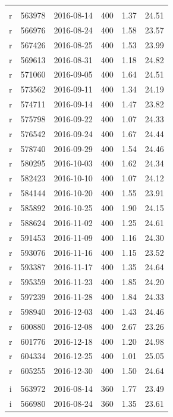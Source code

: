 \documentclass[letterpaper,preprint]{aastex62}
\begin{document}
\begin{table}
\begin{center}
\begin{tabular}{cccccc}
      \hline \\
      r & 563978 & 2016-08-14 & 400 & 1.37 & 24.51 \\
      r & 566976 & 2016-08-24 & 400 & 1.58 & 23.57 \\
      r & 567426 & 2016-08-25 & 400 & 1.53 & 23.99 \\
      r & 569613 & 2016-08-31 & 400 & 1.18 & 24.82 \\
      r & 571060 & 2016-09-05 & 400 & 1.64 & 24.51 \\
      r & 573562 & 2016-09-11 & 400 & 1.34 & 24.19 \\
      r & 574711 & 2016-09-14 & 400 & 1.47 & 23.82 \\
      r & 575798 & 2016-09-22 & 400 & 1.07 & 24.33 \\
      r & 576542 & 2016-09-24 & 400 & 1.67 & 24.44 \\
      r & 578740 & 2016-09-29 & 400 & 1.54 & 24.46 \\
      r & 580295 & 2016-10-03 & 400 & 1.62 & 24.34 \\
      r & 582423 & 2016-10-10 & 400 & 1.07 & 24.12 \\
      r & 584144 & 2016-10-20 & 400 & 1.55 & 23.91 \\
      r & 585892 & 2016-10-25 & 400 & 1.90 & 24.15 \\
      r & 588624 & 2016-11-02 & 400 & 1.25 & 24.61 \\
      r & 591453 & 2016-11-09 & 400 & 1.16 & 24.30 \\
      r & 593076 & 2016-11-16 & 400 & 1.15 & 23.52 \\
      r & 593387 & 2016-11-17 & 400 & 1.35 & 24.64 \\
      r & 595359 & 2016-11-23 & 400 & 1.85 & 24.20 \\
      r & 597239 & 2016-11-28 & 400 & 1.84 & 24.33 \\
      r & 598940 & 2016-12-03 & 400 & 1.43 & 24.46 \\
      r & 600880 & 2016-12-08 & 400 & 2.67 & 23.26 \\
      r & 601776 & 2016-12-18 & 400 & 1.20 & 24.98 \\
      r & 604334 & 2016-12-25 & 400 & 1.01 & 25.05 \\
      r & 605255 & 2016-12-30 & 400 & 1.50 & 24.64 \\
      \hline \\
      i & 563972 & 2016-08-14 & 360 & 1.77 & 23.49 \\
      i & 566980 & 2016-08-24 & 360 & 1.35 & 23.61 \\

\end{tabular}
\end{center}
\end{table}
\end{document}
